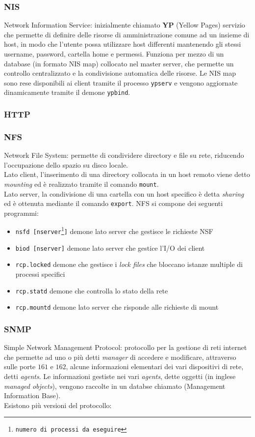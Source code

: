 \documentclass[a4paper,11pt]{article}
\def\code#1{\texttt{#1}}
\def\subsub#1{\subsubsection{#1}\label{#1}}
\def\vedi#1{\nameref{#1}}
\def\italic#1{\textit{#1}}
\begin{document}
\subsub{NIS}
Network Information Service: inizialmente chiamato \textbf{YP} (Yellow Pages) servizio che permette di definire delle risorse di amministrazione comune ad un insieme di host, in modo che l'utente possa utilizzare host differenti mantenendo gli stessi username, password, cartella home e permessi. Funziona per mezzo di un database (in formato NIS map) collocato nel master server, che permette un controllo centralizzato e la condivisione automatica delle risorse. Le NIS map sono rese disponibili ai client tramite il processo \code{ypserv} e vengono aggiornate dinamicamente tramite il demone \code{ypbind}.
\subsub{HTTP} 
\subsub{NFS}
Network File System: permette di condividere directory e file su rete, riducendo l'occupazione dello spazio su disco locale.\\Lato client, l'inserimento di una directory collocata in un host remoto viene detto \italic{mounting} ed è realizzato tramite il comando \code{mount}.\\
Lato server, la condivisione di una cartella con un host specifico è detta \italic{sharing} ed è ottenuta mediante il comando \code{export}.
NFS si compone dei seguenti programmi:
\begin{itemize}
\item \code{nsfd [nserver\footnote{numero di processi da eseguire}]} demone lato server  che gestisce le richieste NSF
\item \code{biod [nserver]} demone lato server che gestice l'I/O dei client
\item \code{rcp.locked} demone che gestisce i \italic{lock files} che bloccano istanze multiple di processi specifici
\item \code{rcp.statd} demone che controlla lo stato della rete
\item \code{rcp.mountd} demone lato server che risponde alle richieste di mount
\end{itemize} 
\subsub{SNMP}  %
Simple Network Management Protocol: protocollo per la gestione di reti internet che permette ad uno o più \vedi{DTE} detti \italic{manager} di accedere e modificare, attraverso \vedi{UDP} sulle porte $161$ e $162$, alcune informazioni elementari dei vari dispositivi di rete, detti \italic{agents}. Le informazioni gestiste nei vari \italic{agents}, dette 
oggetti (in inglese \italic{managed objects}), vengono raccolte in un databse chiamato \vedi{MIB} (Management Information Base).
\\Esistono più versioni del protocollo:
\end{document}

